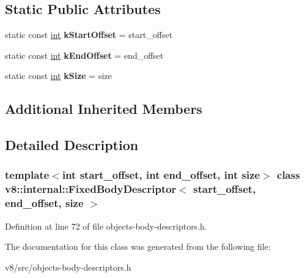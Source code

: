 \subsection*{Static Public Attributes}
\begin{DoxyCompactItemize}
\item 
\mbox{\label{classv8_1_1internal_1_1FixedBodyDescriptor_a1c2c5b9bd26b6d92dc7c86f4c54db927}} 
static const \mbox{\hyperlink{classint}{int}} {\bfseries k\+Start\+Offset} = start\+\_\+offset
\item 
\mbox{\label{classv8_1_1internal_1_1FixedBodyDescriptor_a5cfa9c5d4e9f97129ac63145e583a7ae}} 
static const \mbox{\hyperlink{classint}{int}} {\bfseries k\+End\+Offset} = end\+\_\+offset
\item 
\mbox{\label{classv8_1_1internal_1_1FixedBodyDescriptor_a03c0893d55c2985366e4d64060bae196}} 
static const \mbox{\hyperlink{classint}{int}} {\bfseries k\+Size} = size
\end{DoxyCompactItemize}
\subsection*{Additional Inherited Members}


\subsection{Detailed Description}
\subsubsection*{template$<$int start\+\_\+offset, int end\+\_\+offset, int size$>$\newline
class v8\+::internal\+::\+Fixed\+Body\+Descriptor$<$ start\+\_\+offset, end\+\_\+offset, size $>$}



Definition at line 72 of file objects-\/body-\/descriptors.\+h.



The documentation for this class was generated from the following file\+:\begin{DoxyCompactItemize}
\item 
v8/src/objects-\/body-\/descriptors.\+h\end{DoxyCompactItemize}
